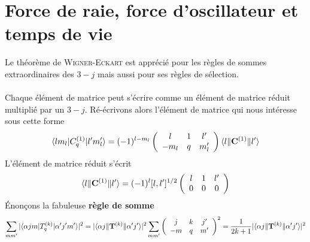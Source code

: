 \section{Force de raie, force d'oscillateur et temps de vie}
Le théorème de \textsc{Wigner-Eckart} est apprécié pour les règles de sommes extraordinaires
des $3-j$ mais aussi pour ses règles de sélection.\\

\ \\

Chaque élément de matrice peut s'écrire comme un élément de matrice réduit multiplié par un
$3-j$. Ré-écrivons alors l'élément de matrice qui nous intéresse sous cette forme
\begin{equation}
 \langle l m_l \vert C^{(1)}_q \vert l'm_l' \rangle =
(-1)^{l-m_l} \left( \begin{array}{ccc}
l  &  1  &  l'  \\ -m_l  &  q  &  m_l' \end{array} \right) 
\langle  l \Vert {\bf C}^{(1)} \Vert l' \rangle
\end{equation}
L'élément de matrice réduit s'écrit
\begin{equation}
\langle  l \Vert {\bf C}^{(1)} \Vert l' \rangle
= (-1)^l [l,l']^{1/2} \left( \begin{array}{ccc}
l  &  1  &  l'  \\ 0  &  0 &  0 \end{array} \right)
\end{equation}
Énonçons la fabuleuse \textbf{règle de somme}
\begin{equation}
\sum_{mm'}  \vert
\langle \alpha j m \vert T^{(k)}_q \vert \alpha' j' m' \rangle \vert ^2
= \vert \langle \alpha j \Vert {\bf T}^{(k)} \Vert \alpha' j' \rangle \vert ^2 
\sum_{mm'} \left( \begin{array}{ccc}
j  &  k  &  j'  \\ -m  &  q  &  m' \end{array} \right) ^2 
=  \frac{1}{2k+1} \vert \langle \alpha j \Vert {\bf T}^{(k)} \Vert \alpha' j' \rangle \vert ^2
\end{equation}


